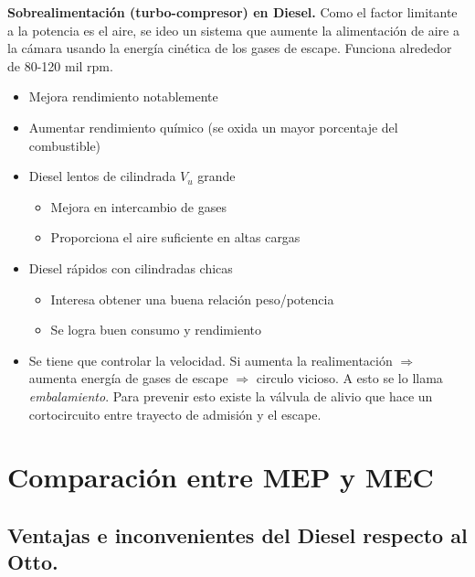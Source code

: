 \textbf{Sobrealimentación (turbo-compresor) en Diesel.} Como el factor limitante a la potencia es el aire, se ideo un sistema que aumente la alimentación de aire a la cámara usando la energía cinética de los gases de escape. Funciona alrededor de 80-120 mil rpm.
\begin{itemize}
    \item Mejora rendimiento notablemente
    \item Aumentar rendimiento químico (se oxida un mayor porcentaje del combustible)
    \item Diesel lentos de cilindrada $V_u$ grande
    \begin{itemize}
        \item Mejora en intercambio de gases
        \item Proporciona el aire suficiente en altas cargas
    \end{itemize}
    \item Diesel rápidos con cilindradas chicas
    \begin{itemize}
        \item Interesa obtener una buena relación peso/potencia
        \item Se logra buen consumo y rendimiento
    \end{itemize}
    \item Se tiene que controlar la velocidad. Si aumenta la realimentación $\Rightarrow$ aumenta energía de gases de escape $\Rightarrow$ circulo vicioso. A esto se lo llama \textit{embalamiento}. Para prevenir esto existe la válvula de alivio que hace un cortocircuito entre trayecto de admisión y el escape.
\end{itemize}

\section{Comparación entre MEP y MEC}
\subsection{Ventajas e inconvenientes del Diesel respecto al Otto.}

